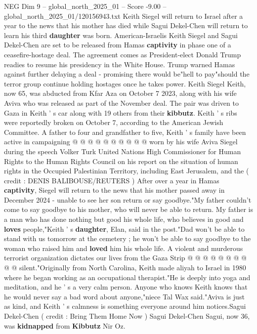 \begin{textsample}{NEG Dim 9 – global\_north\_2025\_01 – Score -9.00 – global\_north\_2025\_01/120156943.txt}  \label{ex:f9_neg_027}
Keith Siegel will return to Israel after a year to the news that his mother has died while Sagui Dekel-Chen will return to learn his third \textbf{daughter} was born.
American-Israelis Keith Siegel and Sagui Dekel-Chen are set to be released from Hamas \textbf{captivity} in phase one of a ceasefire-hostage deal.
The agreement comes as President-elect Donald Trump readies to resume his presidency in the White House.
Trump warned Hamas against further delaying a deal - promising there would be"hell to pay"should the terror group continue holding hostages once he takes power.
Keith Siegel Keith, now 65, was abducted from Kfar Aza on October 7 2023, along with his wife Aviva who was released as part of the November deal.
The pair was driven to Gaza in Keith ' s car along with 19 others from their \textbf{kibbutz}.
Keith ' s ribs were reportedly broken on October 7, according to the American Jewish Committee.
A father to four and grandfather to five, Keith ' s family have been active in campaigning @ @ @ @ @ @ @ @ @ @ worn by his wife Aviva Siegel during the speech Volker Turk United Nations High Commissioner for Human Rights to the Human Rights Council on his report on the situation of human rights in the Occupied Palestinian Territory, including East Jerusalem, and the ( credit : DENIS BALIBOUSE/REUTERS ) After over a year in Hamas \textbf{captivity}, Siegel will return to the news that his mother passed away in December 2024 - unable to see her son return or say goodbye."My father couldn't come to say goodbye to his mother, who will never be able to return.
My father is a man who has done nothing but good his whole life, who believes in good and \textbf{loves} people,"Keith ' s \textbf{daughter}, Elan, said in the post."Dad won't be able to stand with us tomorrow at the cemetery ; he won't be able to say goodbye to the woman who raised him and \textbf{loved} him his whole life.
A violent and murderous terrorist organization dictates our lives from the Gaza Strip @ @ @ @ @ @ @ @ @ @ silent."Originally from North Carolina, Keith made aliyah to Israel in 1980 where he began working as an occupational therapist."He is deeply into yoga and meditation, and he ' s a very calm person.
Anyone who knows Keith knows that he would never say a bad word about anyone,"niece Tal Wax said."Aviva is just as kind, and Keith ' s calmness is something everyone around him notices.Sagui Dekel-Chen ( credit : Bring Them Home Now ) Sagui Dekel-Chen Sagui, now 36, was \textbf{kidnapped} from \textbf{Kibbutz} Nir Oz.

\end{textsample}
